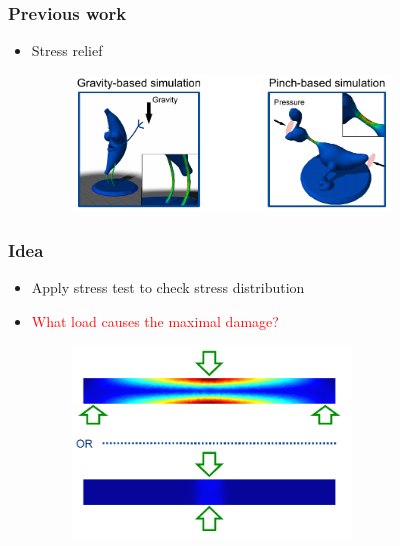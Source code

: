 \documentclass[serif,mathserif, 12pt]{beamer}
\newcommand{\TODO}[1]{\textcolor{red}{#1}}
\begin{document}
\begin{frame}
  \frametitle{Previous work}
  \begin{itemize}
  \item Stress relief
    \begin{figure}
      \centering
      \includegraphics[width=0.8\textwidth]{img/stress_relief}
    \end{figure}
  \end{itemize}
\end{frame}

\begin{frame}
  \frametitle{Idea}
  \begin{itemize}
  \item Apply stress test to check stress distribution
    \pause
  \item \TODO{What load causes the maximal damage?}
    \begin{figure}
    \centering
    \includegraphics[width=0.7\textwidth]{img/load_on_beam}
    \end{figure}
  \end{itemize}
\end{frame}
\end{document}
